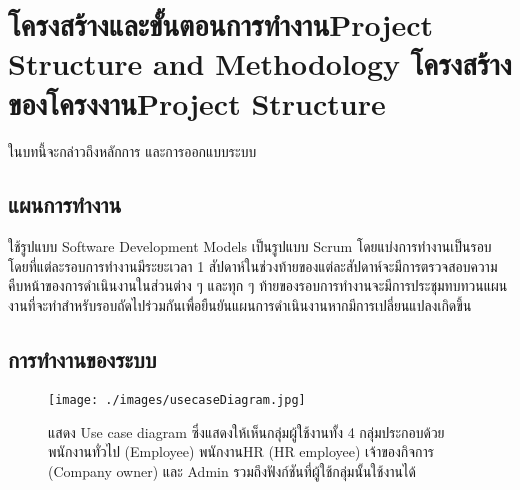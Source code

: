 \chapter{\ifproject%
\ifcpe โครงสร้างและขั้นตอนการทำงาน\else Project Structure and Methodology\fi
\else%
\ifcpe โครงสร้างของโครงงาน\else Project Structure\fi
\fi
}

ในบทนี้จะกล่าวถึงหลักการ และการออกแบบระบบ

\makeatletter


\makeatother

\section{แผนการทำงาน}
\quad ใช้รูปแบบ Software Development Models เป็นรูปแบบ Scrum โดยแบ่งการทำงานเป็นรอบ โดยที่แต่ละรอบการทำงานมีระยะเวลา 1 สัปดาห์ในช่วงท้ายของแต่ละสัปดาห์จะมีการตรวจสอบความคืบหน้าของการดำเนินงานในส่วนต่าง ๆ และทุก ๆ ท้ายของรอบการทำงานจะมีการประชุมทบทวนแผนงานที่จะทำสำหรับรอบถัดไปร่วมกันเพื่อยืนยันแผนการดำเนินงานหากมีการเปลี่ยนแปลงเกิดขึ้น 
\section{การทำงานของระบบ}
\begin{figure}
\begin{center}
\texttt{[image: ./images/usecaseDiagram.jpg]}
\end{center}
\caption[Poem]{แสดง Use case diagram ซึ่งแสดงให้เห็นกลุ่มผู้ใช้งานทั้ง 4 กลุ่มประกอบด้วย พนักงานทั่วไป (Employee) พนักงานHR (HR employee) เจ้าของกิจการ (Company owner) และ Admin รวมถึงฟังก์ชันที่ผู้ใช้กลุ่มนั้นใช้งานได้}
\end{figure}

